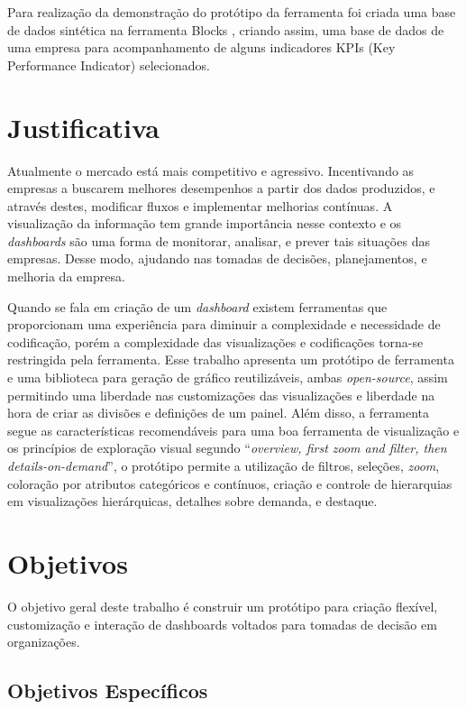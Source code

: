 \documentclass[
	12pt,				%
	openright,			%
	oneside,			%
	a4paper,			%
	english,			%
	brazil				%
	]{abntex2}
\begin{document}
Para realização da demonstração do protótipo da ferramenta foi criada uma base de dados sintética na ferramenta Blocks \cite{blocks}, criando assim, uma base de dados de uma empresa para acompanhamento de alguns indicadores KPIs (Key Performance Indicator) selecionados.


\section{Justificativa}
\label{ch:justificativa}

Atualmente o mercado está mais competitivo e agressivo. Incentivando as empresas a buscarem melhores desempenhos a partir dos dados produzidos, e através destes, modificar fluxos e implementar melhorias contínuas. A visualização da informação tem grande importância nesse contexto e os \textit{dashboards} são uma forma de monitorar, analisar, e prever tais situações das empresas. Desse modo, ajudando nas tomadas de decisões, planejamentos, e melhoria da empresa. 

Quando se fala em criação de um \textit{dashboard} existem ferramentas que proporcionam uma experiência para diminuir a complexidade e necessidade de codificação, porém a complexidade das visualizações e codificações torna-se restringida pela ferramenta. Esse trabalho apresenta um protótipo de ferramenta e uma biblioteca para geração de gráfico reutilizáveis, ambas \textit{open-source}, assim permitindo uma liberdade nas customizações das visualizações e liberdade na hora de criar as divisões e definições de um painel. Além disso, a ferramenta segue as características recomendáveis para uma boa ferramenta de visualização e os princípios de exploração visual segundo \cite{Shneiderman1996} ``\textit{overview, first zoom and filter, then details-on-demand}'', o protótipo permite a utilização de filtros, seleções, \textit{zoom}, coloração por atributos categóricos e contínuos, criação e controle de hierarquias em visualizações hierárquicas, detalhes sobre demanda, e destaque.

\section{Objetivos}
O objetivo geral deste trabalho é construir um protótipo para criação flexível, customização e interação de dashboards voltados para tomadas de decisão em organizações.

\subsection {Objetivos Específicos}
\end{document}
